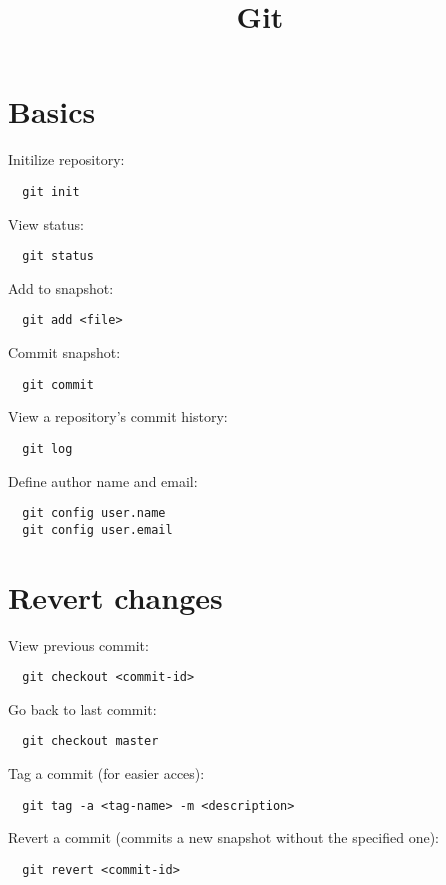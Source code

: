 \documentclass[french]{article}
\title{Git}
\begin{document}
\date{}

\maketitle

\setlength{\parindent}{0cm}

\section{Basics}

Initilize repository:
\begin{verbatim}
  git init
\end{verbatim}

View status:
\begin{verbatim}
  git status
\end{verbatim}

Add to snapshot:
\begin{verbatim}
  git add <file>
\end{verbatim}

Commit snapshot:
\begin{verbatim}
  git commit 
\end{verbatim}

View a repository's commit history:
\begin{verbatim}
  git log 
\end{verbatim}

Define author name and email:
\begin{verbatim}
  git config user.name
  git config user.email
\end{verbatim}

\section{Revert changes}

View previous commit:
\begin{verbatim}
  git checkout <commit-id>
\end{verbatim}

Go back to last commit:
\begin{verbatim}
  git checkout master
\end{verbatim}

Tag a commit (for easier acces):
\begin{verbatim}
  git tag -a <tag-name> -m <description>
\end{verbatim}

Revert a commit (commits a new snapshot without the specified one):
\begin{verbatim}
  git revert <commit-id>
\end{verbatim}
\end{document}
